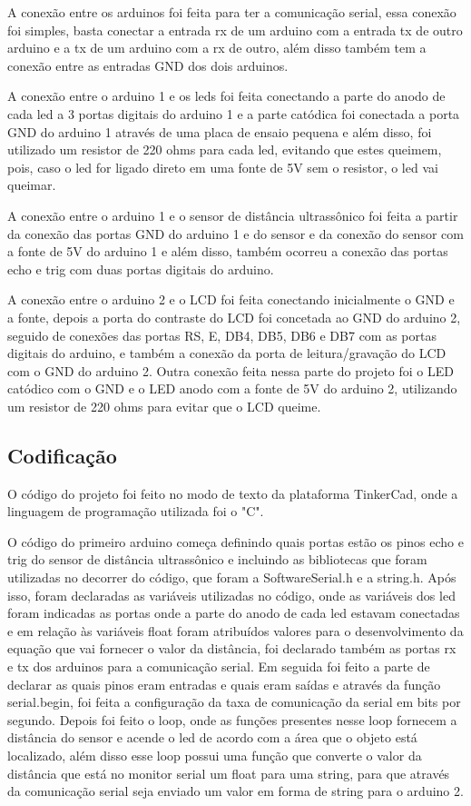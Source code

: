 \documentclass[conference]{IEEEtran}
\begin{document}
A conexão entre os arduinos foi feita para ter a comunicação serial, essa conexão foi simples, basta conectar a entrada rx de um arduino com a entrada tx de outro arduino e a tx de um
arduino com a rx de outro, além disso também tem a conexão entre as entradas GND dos dois arduinos.

A conexão entre o arduino 1 e os leds foi feita conectando a parte do anodo de cada led a 3 portas digitais do arduino 1 e a parte catódica foi conectada a porta GND do arduino 1 através
de uma placa de ensaio pequena e além disso, foi utilizado um resistor de 220 ohms para cada led, evitando que estes queimem, pois, caso o led for ligado direto em uma fonte de 5V sem o 
resistor, o led vai queimar.

A conexão entre o arduino 1 e o sensor de distância ultrassônico foi feita a partir da conexão das portas GND do arduino 1 e do sensor e da conexão do sensor com a fonte de 5V do arduino 1 e
além disso, também ocorreu a conexão das portas echo e trig com duas portas digitais do arduino.

A conexão entre o arduino 2 e o LCD foi feita conectando inicialmente o GND e a fonte, depois a porta do contraste do LCD foi concetada ao GND do arduino 2, seguido de conexões das portas
RS, E, DB4, DB5, DB6 e DB7 com as portas digitais do arduino, e também a conexão da porta de leitura/gravação do LCD com o GND do arduino 2.
Outra conexão feita nessa parte do projeto foi o LED catódico com o GND e o LED anodo com a fonte de 5V do arduino 2, utilizando um resistor de 220 ohms para evitar que o LCD queime.  



\subsection{Codificação}

O código do projeto foi feito no modo de texto da plataforma TinkerCad, onde a linguagem de programação utilizada foi o "C".

O código do primeiro arduino começa definindo quais portas estão os pinos echo e trig do sensor de distância ultrassônico e incluindo as bibliotecas que foram utilizadas 
no decorrer do código, que foram a SoftwareSerial.h e a string.h.
Após isso, foram declaradas as variáveis utilizadas no código, onde as variáveis dos led foram indicadas as portas onde a parte do anodo de cada led estavam conectadas e 
em relação às variáveis float foram atribuídos valores para o desenvolvimento da equação que vai fornecer o valor da distância, foi declarado também as portas rx e tx dos
arduinos para a comunicação serial.
Em seguida foi feito a parte de declarar as quais pinos eram entradas e quais eram saídas e através da função serial.begin, foi feita a configuração da taxa de comunicação da serial
em bits por segundo.
Depois foi feito o loop, onde as funções presentes nesse loop fornecem a distância do sensor e acende o led de acordo com a área que o objeto está localizado, além disso esse loop
possui uma função que converte o valor da distância que está no monitor serial um float para uma string, para que através da comunicação serial seja enviado um valor em forma 
de string para o arduino 2.
\end{document}
